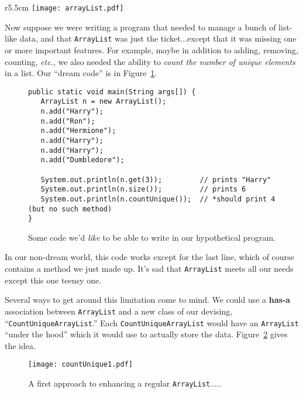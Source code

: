 \begin{wrapfigure}{r}{5.5cm}
\vspace{-.2in}
\texttt{[image: arrayList.pdf]}
\caption{An abbreviated \texttt{ArrayList} class.}
\label{fig:abbrArrayList}
\end{wrapfigure}

Now suppose we were writing a program that needed to manage a bunch of
list-like data, and that \texttt{ArrayList} was just the ticket...except that
it was missing one or more important features. For example, maybe in addition
to adding, removing, counting, \textit{etc.}, we also needed the ability to
\textit{count the number of unique elements} in a list. Our ``dream code'' is
in Figure~\ref{fig:dreamCountUnique}.

\begin{figure}[hb]
\centering
\begin{Verbatim}[fontsize=\footnotesize,samepage=true,frame=single]
public static void main(String args[]) {
   ArrayList n = new ArrayList();
   n.add("Harry");
   n.add("Ron");
   n.add("Hermione");
   n.add("Harry");
   n.add("Harry");
   n.add("Dumbledore");
 
   System.out.println(n.get(3));         // prints "Harry"
   System.out.println(n.size());         // prints 6
   System.out.println(n.countUnique());  // *should print 4 (but no such method)
}
\end{Verbatim}
\caption{Some code we'd \textit{like} to be able to write in our hypothetical
program.}
\label{fig:dreamCountUnique}
\end{figure}

In our non-dream world, this code works except for the last line, which of
course contains a method we just made up. It's sad that \texttt{ArrayList}
meets all our needs except this one teensy one.

Several ways to get around this limitation come to mind. We could use a
\textbf{has-a} association between \texttt{ArrayList} and a new class of our
devising, ``\texttt{CountUniqueArrayList}.'' Each \texttt{CountUniqueArrayList}
would have an \texttt{ArrayList} ``under the hood'' which it would use to
actually store the data. Figure~\ref{fig:countUnique1} gives the idea.

\begin{figure}
\centering
\texttt{[image: countUnique1.pdf]}  %
\caption{A first approach to enhancing a regular \texttt{ArrayList}.....}
\label{fig:countUnique1}
\end{figure}


